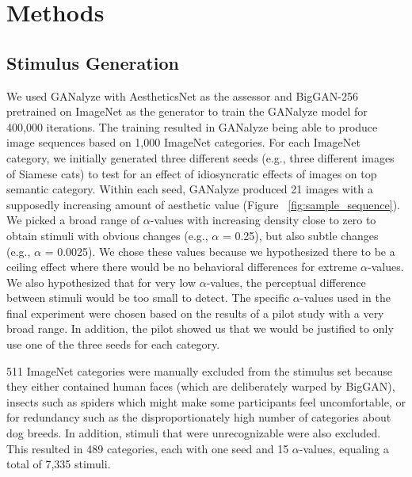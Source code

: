\documentclass[../main.tex]{subfiles}
\begin{document}
\section{Methods}

	\subsection{Stimulus Generation}
	We used GANalyze with AestheticsNet \parencite{kongPhotoAestheticsRanking2016} as the assessor and BigGAN-256 \parencite{brockLargeScaleGAN2019} pretrained on ImageNet \parencite{russakovskyImageNetLargeScale2015} as the generator to train the GANalyze model for 400,000 iterations. The training resulted in GANalyze being able to produce image sequences based on 1,000 ImageNet categories. For each ImageNet category, we initially generated three different seeds (e.g., three different images of Siamese cats) to test for an effect of idiosyncratic effects of images on top semantic category. Within each seed, GANalyze produced 21 images with a supposedly increasing amount of aesthetic value (Figure ~\ref{fig:sample_sequence}). We picked a broad range of $\alpha$-values with increasing density close to zero to obtain stimuli with obvious changes (e.g., $\alpha$ = 0.25), but also subtle changes (e.g., $\alpha$ = 0.0025). We chose these values because we hypothesized there to be a ceiling effect where there would be no behavioral differences for extreme $\alpha$-values. We also hypothesized that for very low $\alpha$-values, the perceptual difference between stimuli would be too small to detect. The specific $\alpha$-values used in the final experiment were chosen based on the results of a pilot study with a very broad range. In addition, the pilot showed us that we would be justified to only use one of the three seeds for each category.
	
	511 ImageNet categories were manually excluded from the stimulus set because they either contained human faces (which are deliberately warped by BigGAN), insects such as spiders which might make some participants feel uncomfortable, or for redundancy such as the disproportionately high number of categories about dog breeds. In addition, stimuli that were unrecognizable were also excluded. This resulted in 489 categories, each with one seed and 15 $\alpha$-values, equaling a total of 7,335 stimuli.
	
\end{document}
